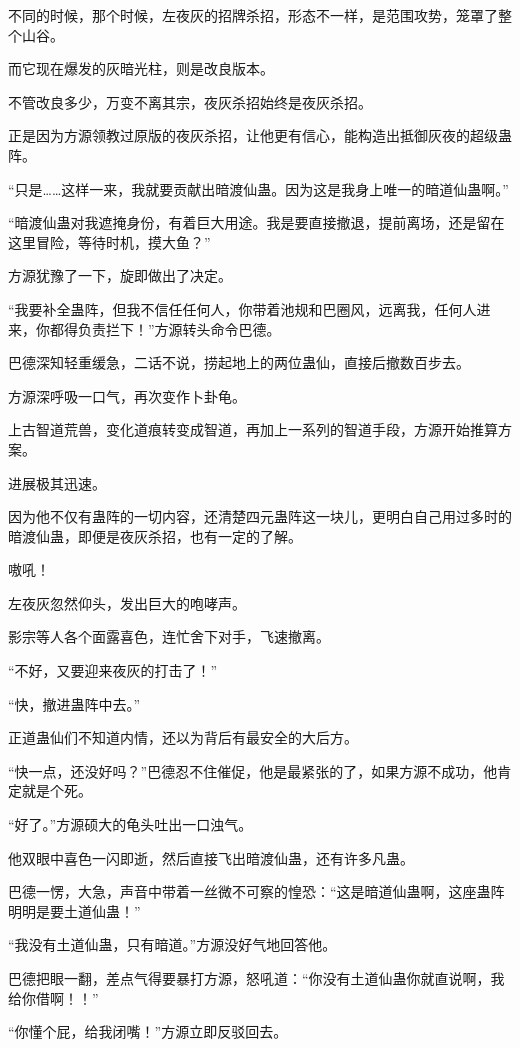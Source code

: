 \begin{this_body}
不同的时候，那个时候，左夜灰的招牌杀招，形态不一样，是范围攻势，笼罩了整个山谷。

而它现在爆发的灰暗光柱，则是改良版本。

不管改良多少，万变不离其宗，夜灰杀招始终是夜灰杀招。

正是因为方源领教过原版的夜灰杀招，让他更有信心，能构造出抵御灰夜的超级蛊阵。

“只是……这样一来，我就要贡献出暗渡仙蛊。因为这是我身上唯一的暗道仙蛊啊。”

“暗渡仙蛊对我遮掩身份，有着巨大用途。我是要直接撤退，提前离场，还是留在这里冒险，等待时机，摸大鱼？”

方源犹豫了一下，旋即做出了决定。

“我要补全蛊阵，但我不信任任何人，你带着池规和巴圈风，远离我，任何人进来，你都得负责拦下！”方源转头命令巴德。

巴德深知轻重缓急，二话不说，捞起地上的两位蛊仙，直接后撤数百步去。

方源深呼吸一口气，再次变作卜卦龟。

上古智道荒兽，变化道痕转变成智道，再加上一系列的智道手段，方源开始推算方案。

进展极其迅速。

因为他不仅有蛊阵的一切内容，还清楚四元蛊阵这一块儿，更明白自己用过多时的暗渡仙蛊，即便是夜灰杀招，也有一定的了解。

嗷吼！

左夜灰忽然仰头，发出巨大的咆哮声。

影宗等人各个面露喜色，连忙舍下对手，飞速撤离。

“不好，又要迎来夜灰的打击了！”

“快，撤进蛊阵中去。”

正道蛊仙们不知道内情，还以为背后有最安全的大后方。

“快一点，还没好吗？”巴德忍不住催促，他是最紧张的了，如果方源不成功，他肯定就是个死。

“好了。”方源硕大的龟头吐出一口浊气。

他双眼中喜色一闪即逝，然后直接飞出暗渡仙蛊，还有许多凡蛊。

巴德一愣，大急，声音中带着一丝微不可察的惶恐：“这是暗道仙蛊啊，这座蛊阵明明是要土道仙蛊！”

“我没有土道仙蛊，只有暗道。”方源没好气地回答他。

巴德把眼一翻，差点气得要暴打方源，怒吼道：“你没有土道仙蛊你就直说啊，我给你借啊！！”

“你懂个屁，给我闭嘴！”方源立即反驳回去。


\end{this_body}
